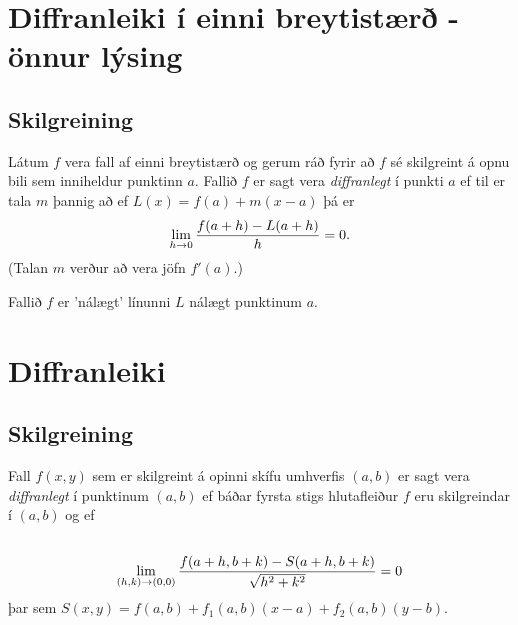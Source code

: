 \documentclass[a4paper,10pt,icelandic]{sphinxmanual}
\begin{document}

\section{Diffranleiki í einni breytistærð - önnur lýsing}
\label{Kafli2:index-14}\label{Kafli2:diffranleiki-i-einni-breytistaer-onnur-lysing}

\subsection{Skilgreining}
\label{Kafli2:id29}
Látum \(f\) vera fall af einni breytistærð og gerum ráð fyrir að
\(f\) sé skilgreint á opnu bili sem inniheldur punktinn \(a\).
Fallið \(f\) er sagt vera \textit{diffranlegt} í punkti \(a\) ef til er
tala \(m\) þannig að ef \(L(x)=f(a)+m(x-a)\) þá er
\begin{gather}
\begin{split}\displaystyle \lim_{h\rightarrow 0}\frac{f(a+h)-L(a+h)}{h}=0.\end{split}\notag
\end{gather}
(Talan \(m\) verður að vera jöfn \(f'(a)\).)

Fallið \(f\) er ’nálægt’ línunni \(L\) nálægt punktinum
\(a\).


\section{Diffranleiki}
\label{Kafli2:diffranleiki}

\subsection{Skilgreining}
\label{Kafli2:id30}\label{Kafli2:index-15}
Fall \(f(x,y)\) sem er skilgreint á opinni skífu umhverfis
\((a,b)\) er sagt vera \textit{diffranlegt} í punktinum \((a,b)\) ef
báðar fyrsta stigs hlutafleiður \(f\) eru skilgreindar í
\((a,b)\) og ef
\begin{gather}
\begin{split}\displaystyle\end{split}\notag\\\begin{split}\lim_{(h,k)\rightarrow (0,0)}
\frac{f(a+h, b+k)-S(a+h,b+k)}{\sqrt{h^2+k^2}}=0\end{split}\notag
\end{gather}
þar sem \(S(x,y) = f(a,b) + f_1(a,b)(x-a)+f_2(a,b)(y-b)\).
\end{document}
